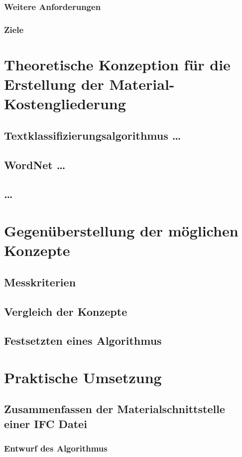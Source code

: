 \subsubsection{Weitere Anforderungen}
\label{s:requirements:requirements:additional}
\subsubsection{Ziele}
\label{s:requirements:requirements:goals}

\section{Theoretische Konzeption für die Erstellung der Material-Kostengliederung}
\subsection{{Textklassifizierungsalgorithmus \dots}}
\subsection{{WordNet \dots}}
\subsection{\dots}

\section{Gegenüberstellung der möglichen Konzepte}
\subsection{Messkriterien}
\subsection{Vergleich der Konzepte}
\subsection{Festsetzten eines Algorithmus}
\section{Praktische Umsetzung}
\subsection{Zusammenfassen der Materialschnittstelle einer IFC Datei}
\subsubsection{Entwurf des Algorithmus}
